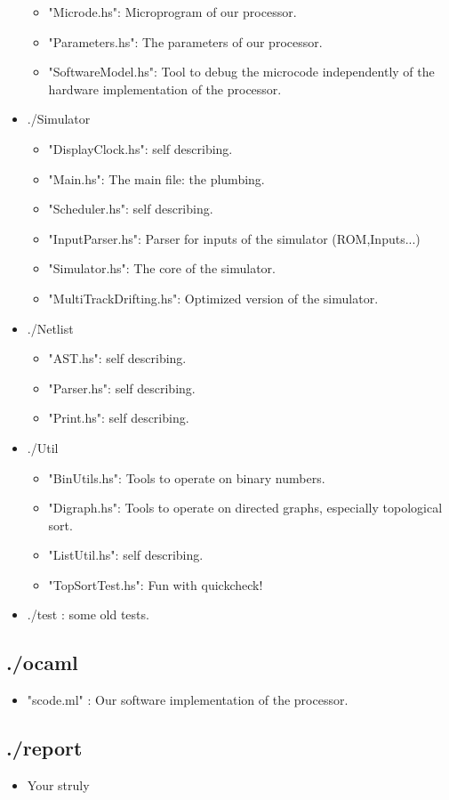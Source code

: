 \documentclass[a4paper, 11pt]{article}
\begin{document}
\begin{itemize}
\begin{itemize}
\item "Microde.hs": Microprogram of our processor.
\item "Parameters.hs": The parameters of our processor.
\item "SoftwareModel.hs": Tool to debug the microcode independently of the
hardware implementation of the processor.  
\end{itemize}
\item ./Simulator
\begin{itemize}
\item "DisplayClock.hs": self describing.
\item "Main.hs": The main file: the plumbing.
\item "Scheduler.hs": self describing.
\item "InputParser.hs": Parser for inputs of the simulator (ROM,Inputs...)
\item "Simulator.hs": The core of the simulator.
\item "MultiTrackDrifting.hs": Optimized version of the simulator.
\end{itemize}
\item ./Netlist 
\begin{itemize}
\item "AST.hs": self describing.
\item "Parser.hs": self describing.
\item "Print.hs": self describing.
\end{itemize}
\item ./Util
\begin{itemize}
\item "BinUtils.hs": Tools to operate on binary numbers.
\item "Digraph.hs": Tools to operate on directed graphs, especially topological sort.
\item "ListUtil.hs": self describing.
\item "TopSortTest.hs": Fun with quickcheck!
\end{itemize}
\item ./test : some old tests.
\end{itemize}

\subsection{./ocaml}
\begin{itemize}
\item "scode.ml" : Our software implementation of the processor. 
\end{itemize}
\subsection{./report}
\begin{itemize}
\item Your struly
\end{itemize}




\end{document}
